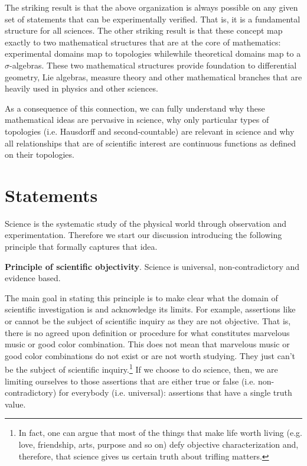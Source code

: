 \documentclass[11pt,letterpaper,fleqn]{memoir} %
\begin{document}
The striking result is that the above organization is always possible on any given set of statements that can be experimentally verified. That is, it is a fundamental structure for all sciences. The other striking result is that these concept map exactly to two mathematical structures that are at the core of mathematics: experimental domains map to topologies whilewhile theoretical domains map to a $\sigma$-algebras. These two mathematical structures provide foundation to differential geometry, Lie algebras, measure theory and other mathematical branches that are heavily used in physics and other sciences.

As a consequence of this connection, we can fully understand why these mathematical ideas are pervasive in science, why only particular types of topologies (i.e. Hausdorff and second-countable) are relevant in science and why all relationships that are of scientific interest are continuous functions as defined on their topologies.

\section{Statements}

Science is the systematic study of the physical world through observation and experimentation. Therefore we start our discussion introducing the following principle that formally captures that idea.

\begin{mathSection}
	\textbf{Principle of scientific objectivity}.
		Science is universal, non-contradictory and evidence based.
\end{mathSection}

The main goal in stating this principle is to make clear what the domain of scientific investigation is and acknowledge its limits. For example, assertions like  or  cannot be the subject of scientific inquiry as they are not objective. That is, there is no agreed upon definition or procedure for what constitutes marvelous music or good color combination. This does not mean that marvelous music or good color combinations do not exist or are not worth studying. They just can't be the subject of scientific inquiry.\footnote{In fact, one can argue that most of the things that make life worth living (e.g. love, friendship, arts, purpose and so on) defy objective characterization and, therefore, that science gives us certain truth about trifling matters.} If we choose to do science, then, we are limiting ourselves to those assertions that are either true or false (i.e. non-contradictory) for everybody (i.e. universal): assertions that have a single truth value.
\end{document}
